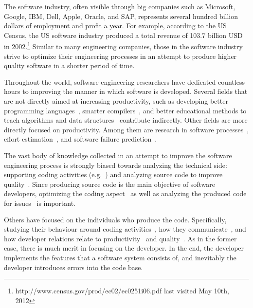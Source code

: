 The software industry, often visible through big companies such as Microsoft, Google, IBM, Dell, Apple, Oracle, and SAP, represents several hundred billion dollars of employment and profit a year. 
For example, according to the US Census, the US software industry produced a total revenue of 103.7 billion USD in 2002.\footnote{http://www.census.gov/prod/ec02/ec0251i06.pdf last visited May 10th, 2012}
Similar to many engineering companies, those in the software industry strive to optimize their engineering processes in an attempt to produce higher quality software in a shorter period of time.

Throughout the world, software engineering researchers have dedicated countless hours to improving the manner in which software is developed.
Several fields that are not directly aimed at increasing productivity, such as developing better programming languages~\cite{conf:prog:lang}, smarter compilers~\cite{cong:comp:constr}, and better educational methods to teach algorithms and data structures~\cite{conf:sigcse} contribute indirectly.
Other fields are more directly focused on productivity.
Among them are research in software processes~\cite{conf:icssp}, effort estimation~\cite{molkken:isese:2003,boehm:analse:2000}, and software failure prediction~\cite{conf:promise}.

The vast body of knowledge collected in an attempt to improve the software engineering process is strongly biased towards analyzing the technical side: supporting coding activities (e.g.~\cite{bassil:iwpc:2001,mens:tse:2004}) and analyzing source code to improve quality~\cite{zimmermann:oopsla:2005,nagappan:icse:2006}. 
Since producing source code is the main objective of software developers, optimizing the coding aspect~\cite{bassil:iwpc:2001,mens:tse:2004} as well as analyzing the produced code for issues~\cite{nagappan:icse:2005,schroeter:isese:2006} is important.

Others have focused on the individuals who produce the code. Specifically, studying their behaviour around coding activities~\cite{latoza:icse:2006}, how they communicate~\cite{ko:icse:2007,gopal:2002:comacm}, and how developer relations relate to productivity~\cite{gopal:2002:comacm} and quality~\cite{abreu:iwpse:2009,wolf:icse:2009}.
As in the former case, there is much merit in focusing on the developer.
In the end, the developer implements the features that a software system consists of, and inevitably the developer introduces errors into the code base.

